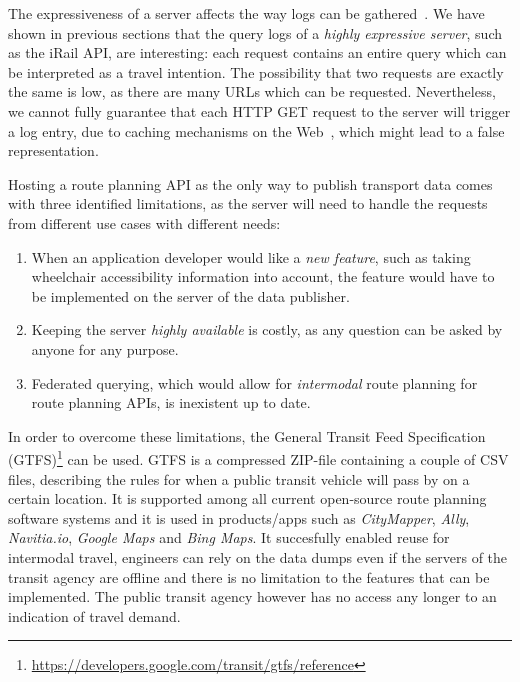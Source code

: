 \documentclass{sig-alternate}
\begin{document}
The expressiveness of a server affects the way logs can be gathered~\cite{usewod2015}.
We have shown in previous sections that the query logs of a \emph{highly expressive server}, such as the iRail API, are interesting: each request contains an entire query which can be interpreted as a travel intention.
The possibility that two requests are exactly the same is low, as there are many URLs which can be requested.
Nevertheless, we cannot fully guarantee that each HTTP GET request to the server will trigger a log entry, due to caching mechanisms on the Web~\cite{fielding}, which might lead to a false representation.

Hosting a route planning API as the only way to publish transport data comes with three identified limitations, as the server will need to handle the requests from different use cases with different needs:
\begin{enumerate}
  \item When an application developer would like a \emph{new feature}, such as taking wheelchair accessibility information into account, the feature would have to be implemented on the server of the data publisher.
  \item Keeping the server \emph{highly available} is costly, as any question can be asked by anyone for any purpose.
  \item Federated querying, which would allow for \emph{intermodal} route planning for route planning APIs, is inexistent up to date.
\end{enumerate}

In order to overcome these limitations, the General Transit Feed Specification (GTFS)\footnote{\url{https://developers.google.com/transit/gtfs/reference}} can be used. 
GTFS is a compressed ZIP-file containing a couple of CSV files, describing the rules for when a public transit vehicle will pass by on a certain location.
It is supported among all current open-source route planning software systems and it is used in products/apps such as \emph{CityMapper}, \emph{Ally}, \emph{Navitia.io}, \emph{Google Maps} and \emph{Bing Maps}.
It succesfully enabled reuse for intermodal travel, engineers can rely on the data dumps even if the servers of the transit agency are offline and there is no limitation to the features that can be implemented.
The public transit agency however has no access any longer to an indication of travel demand.
\end{document}
